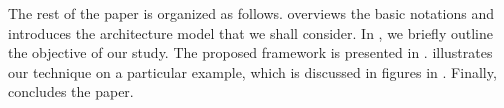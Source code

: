 The rest of the paper is organized as follows.  overviews the basic notations and introduces the architecture model that we shall consider. In , we briefly outline the objective of our study. The proposed framework is presented in .  illustrates our technique on a particular example, which is discussed in figures in . Finally,  concludes the paper.
